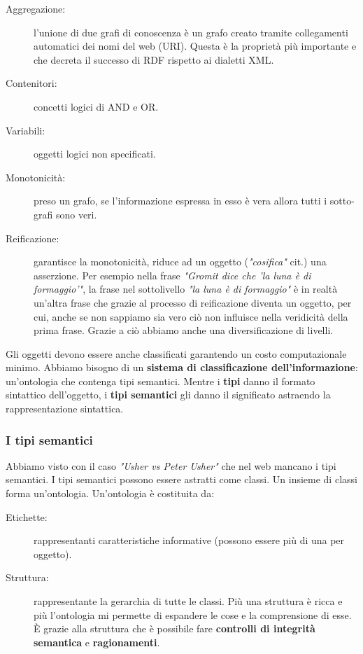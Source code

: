 				\begin{description}
					\item[Aggregazione:] l'unione di due grafi di conoscenza è un grafo creato tramite collegamenti automatici dei nomi del web (URI). Questa è la proprietà più importante e che decreta il successo di RDF rispetto ai dialetti XML. 
					\item[Contenitori:] concetti logici di AND e OR.
					\item[Variabili:] oggetti logici non specificati.
					\item[Monotonicità:] preso un grafo, se l'informazione espressa in esso è vera allora tutti i sotto-grafi sono veri.
					\item[Reificazione:] garantisce la monotonicità, riduce ad un oggetto (\emph{"cosifica"} cit.) una asserzione. Per esempio nella frase \emph{"Gromit dice che 'la luna è di formaggio'"}, la frase nel sottolivello \emph{"la luna è di formaggio"} è in realtà un'altra frase che grazie al processo di reificazione diventa un oggetto, per cui, anche se non sappiamo sia vero ciò non influisce nella veridicità della prima frase. Grazie a ciò abbiamo anche una diversificazione di livelli.
				\end{description}
				
				Gli oggetti devono essere anche classificati garantendo un costo computazionale minimo. Abbiamo bisogno di un \textbf{sistema di classificazione dell'informazione}: un'ontologia che contenga tipi semantici. Mentre i \textbf{tipi} danno il formato sintattico dell'oggetto, i \textbf{tipi semantici} gli danno il significato astraendo la rappresentazione sintattica.
				
			\subsubsection{I tipi semantici}
				Abbiamo visto con il caso \emph{"Usher vs Peter Usher"} che nel web mancano i tipi semantici. I tipi semantici possono essere astratti come classi. Un insieme di classi forma un'ontologia. Un'ontologia è costituita da:
				\begin{description}
					\item[Etichette:] rappresentanti caratteristiche informative (possono essere più di una per oggetto).
					\item[Struttura:] rappresentante la gerarchia di tutte le classi. Più una struttura è ricca e più l'ontologia mi permette di espandere le cose e la comprensione di esse. È grazie alla struttura che è possibile fare \textbf{controlli di integrità semantica} e \textbf{ragionamenti}.
				\end{description}
				

